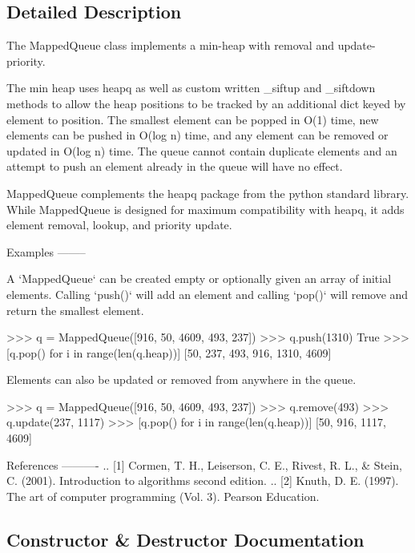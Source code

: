\subsection{Detailed Description}
\begin{DoxyVerb}The MappedQueue class implements a min-heap with removal and update-priority.

The min heap uses heapq as well as custom written _siftup and _siftdown
methods to allow the heap positions to be tracked by an additional dict
keyed by element to position. The smallest element can be popped in O(1) time,
new elements can be pushed in O(log n) time, and any element can be removed
or updated in O(log n) time. The queue cannot contain duplicate elements
and an attempt to push an element already in the queue will have no effect.

MappedQueue complements the heapq package from the python standard
library. While MappedQueue is designed for maximum compatibility with
heapq, it adds element removal, lookup, and priority update.

Examples
--------

A `MappedQueue` can be created empty or optionally given an array of
initial elements. Calling `push()` will add an element and calling `pop()`
will remove and return the smallest element.

>>> q = MappedQueue([916, 50, 4609, 493, 237])
>>> q.push(1310)
True
>>> [q.pop() for i in range(len(q.heap))]
[50, 237, 493, 916, 1310, 4609]

Elements can also be updated or removed from anywhere in the queue.

>>> q = MappedQueue([916, 50, 4609, 493, 237])
>>> q.remove(493)
>>> q.update(237, 1117)
>>> [q.pop() for i in range(len(q.heap))]
[50, 916, 1117, 4609]

References
----------
.. [1] Cormen, T. H., Leiserson, C. E., Rivest, R. L., & Stein, C. (2001).
   Introduction to algorithms second edition.
.. [2] Knuth, D. E. (1997). The art of computer programming (Vol. 3).
   Pearson Education.
\end{DoxyVerb}
 

\subsection{Constructor \& Destructor Documentation}
\mbox{\label{classnetworkx_1_1utils_1_1mapped__queue_1_1MappedQueue_a82eb90efb8f6df3a3fcf56c0ec624fbf}} 
